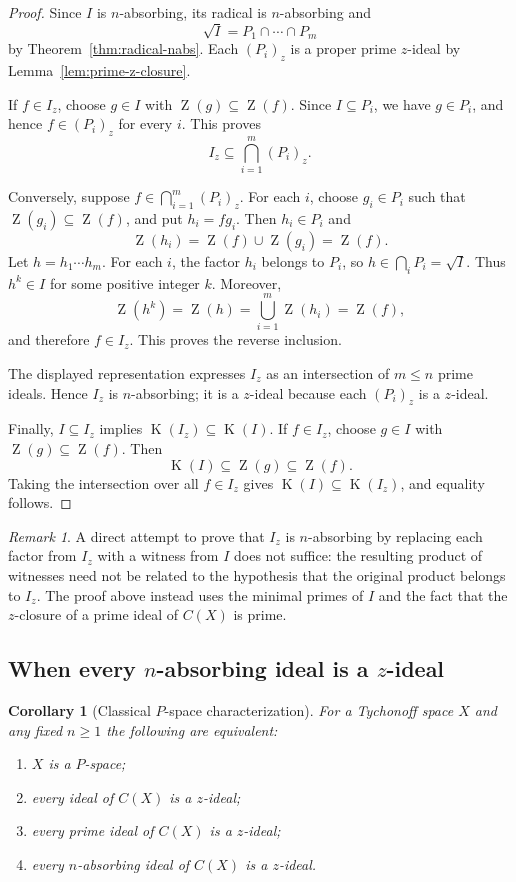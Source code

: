 \documentclass[11pt]{amsart}
\newtheorem{corollary}[theorem]{Corollary}
\theoremstyle{definition}
\theoremstyle{remark}
\newtheorem{remark}[theorem]{Remark}
\DeclareMathOperator{\Z}{Z}
\DeclareMathOperator{\K}{K}
\begin{document}
\begin{proof}
Since $I$ is $n$-absorbing, its radical is $n$-absorbing and
\[
\sqrt I=P_1\cap\cdots\cap P_m
\]
by Theorem~\ref{thm:radical-nabs}. Each $(P_i)_z$ is a proper prime
$z$-ideal by Lemma~\ref{lem:prime-z-closure}.

If $f\in I_z$, choose $g\in I$ with $\Z(g)\subseteq\Z(f)$.
Since $I\subseteq P_i$, we have $g\in P_i$, and hence
$f\in(P_i)_z$ for every $i$. This proves
\[
I_z\subseteq\bigcap_{i=1}^m(P_i)_z.
\]

Conversely, suppose $f\in\bigcap_{i=1}^m(P_i)_z$. For each $i$,
choose $g_i\in P_i$ such that $\Z(g_i)\subseteq\Z(f)$, and put
$h_i=fg_i$. Then $h_i\in P_i$ and
\[
\Z(h_i)=\Z(f)\cup\Z(g_i)=\Z(f).
\]
Let $h=h_1\cdots h_m$. For each $i$, the factor $h_i$ belongs to
$P_i$, so $h\in\bigcap_iP_i=\sqrt I$. Thus $h^k\in I$ for some
positive integer $k$. Moreover,
\[
\Z(h^k)=\Z(h)=\bigcup_{i=1}^m\Z(h_i)=\Z(f),
\]
and therefore $f\in I_z$. This proves the reverse inclusion.

The displayed representation expresses $I_z$ as an intersection
of $m\le n$ prime ideals. Hence $I_z$ is $n$-absorbing; it is a
$z$-ideal because each $(P_i)_z$ is a $z$-ideal.

Finally, $I\subseteq I_z$ implies
$\K(I_z)\subseteq\K(I)$. If $f\in I_z$, choose $g\in I$ with
$\Z(g)\subseteq\Z(f)$. Then
\[
\K(I)\subseteq\Z(g)\subseteq\Z(f).
\]
Taking the intersection over all $f\in I_z$ gives
$\K(I)\subseteq\K(I_z)$, and equality follows.
\end{proof}

\begin{remark}
A direct attempt to prove that $I_z$ is $n$-absorbing by replacing
each factor from $I_z$ with a witness from $I$ does not suffice:
the resulting product of witnesses need not be related to the
hypothesis that the original product belongs to $I_z$. The proof
above instead uses the minimal primes of $I$ and the fact that the
$z$-closure of a prime ideal of $C(X)$ is prime.
\end{remark}

\subsection{When every \texorpdfstring{$n$}{n}-absorbing ideal is a \texorpdfstring{$z$}{z}-ideal}

\begin{corollary}[Classical $P$-space characterization]
\label{thm:every-nabs-is-z}
For a Tychonoff space $X$ and any fixed $n\ge1$ the following are
equivalent:
\begin{enumerate}[label=\textup{(\roman*)}]
\item $X$ is a $P$-space;
\item every ideal of $C(X)$ is a $z$-ideal;
\item every prime ideal of $C(X)$ is a $z$-ideal;
\item every $n$-absorbing ideal of $C(X)$ is a $z$-ideal.
\end{enumerate}
\end{corollary}
\end{document}
